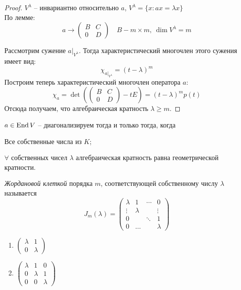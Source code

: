 \begin{proof}
	$V^{\lambda}$ -- инвариантно относительно $a$, $V^{\lambda} = \{x: ax = \lambda x\}$\\
	По лемме:
	$$a \to \left(\begin{array}{cc}
		B & C\\
		0 & D
	\end{array}\right) \quad B - m \times m, \ \dim V^{\lambda} = m$$

	Рассмотрим сужение $a \big|_{V^{\lambda}}$. Тогда характеристический многочлен этого сужения имеет вид:
	\[\chi_{a \big|_{V^{\lambda}}} = (t - \lambda)^m\]
	Построим теперь характеристический многочлен оператора $a$:
	\[\chi_a = \det \left( \left(\begin{array}{cc}
		B & C\\
		0 & D
	\end{array}\right) - tE \right) = (t - \lambda)^m p(t)\] 
	Отсюда получаем, что алгебраическая кратность $\lambda \geqslant m$.
\end{proof}

\begin{Thm} 
	$a \in \operatorname{End} V$ -- диагонализируем тогда и только тогда, когда 
	
	\begin{MyList}
		\item Все собственные числа из $K$;
		\item $\forall$ собственных чисел $\lambda$ алгебраическая кратность равна геометрической кратности.
	\end{MyList}
\end{Thm} 


\begin{Def}
	\textit{Жордановой клеткой}  порядка $m$, соответствующей собственному числу $\lambda$ называется
	\[J_m(\lambda) = \left( \begin{array}{cccc}
		\lambda & 1 & \cdots & 0\\
		\vdots & \lambda &  & \vdots\\
		0 & & \ddots &  1\\
		0 & \dots & & \lambda
	\end{array} \right)\]
\end{Def} 

\begin{Example}
	\begin{enumerate}
		\item $\left(\begin{array}{cc}
			\lambda & 1\\
			0 & \lambda
		\end{array}\right)$
		\item $\left(\begin{array}{ccc}
			\lambda & 1 & 0\\
			0 & \lambda & 1\\
			0 & 0 & \lambda
		\end{array}\right)$
	\end{enumerate}
\end{Example}

